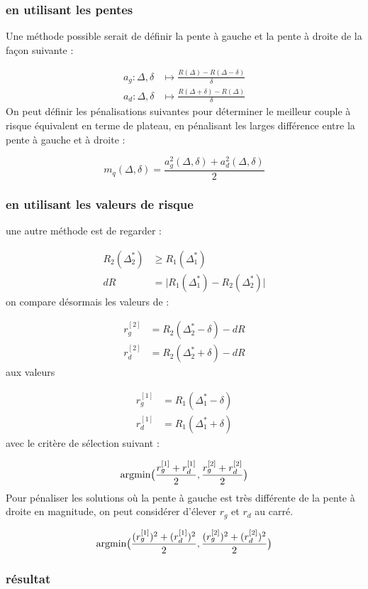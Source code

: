 \subsubsection{en utilisant les pentes}


Une méthode possible serait de définir la pente à gauche et la pente à droite de la façon suivante :

\begin{align*}
	a_g : \Delta, \delta & \mapsto \frac{R(\Delta) - R(\Delta - \delta)}{\delta} \\
	a_d : \Delta, \delta & \mapsto \frac{R(\Delta + \delta) - R(\Delta)}{\delta}
\end{align*}
On peut définir les pénalisations suivantes pour déterminer le meilleur couple à risque équivalent en terme de plateau, en pénalisant les larges différence entre la pente à gauche et à droite :

\begin{equation*}
	m_q(\Delta, \delta) = \frac{a_g^2(\Delta, \delta) + a_d^2(\Delta, \delta)}{2}
\end{equation*}

\subsubsection{en utilisant les valeurs de risque}
une autre méthode est de regarder :

\begin{align*}
	R_2(\Delta^*_2) & \geq R_1(\Delta^*_1)                                      \\
	dR              & = \bigl\vert R_1(\Delta^*_1) - R_2(\Delta^*_2) \bigr\vert
\end{align*}
on compare désormais les valeurs de :

\begin{align*}
	r_g^{[2]} & = R_2(\Delta^*_2 - \delta) - dR \\
	r_d^{[2]} & = R_2(\Delta^*_2 + \delta) - dR
\end{align*}
aux valeurs

\begin{align*}
	r_g^{[1]} & = R_1(\Delta^*_1 - \delta) \\
	r_d^{[1]} & = R_1(\Delta^*_1 + \delta)
\end{align*}
avec le critère de sélection suivant :

\begin{equation*}
	\argmin \bigl( \frac{r_g^{[1]} + r_d^{[1]}}{2}, \frac{r_g^{[2]} + r_d^{[2]}}{2}  \bigr)
\end{equation*}
Pour pénaliser les solutions où la pente à gauche est très différente de la pente à droite en magnitude, on peut considérer d'élever $r_g$ et $r_d$ au carré.

\begin{equation*}
	\argmin \bigl( \frac{(r_g^{[1]})^2 + (r_d^{[1]})^2}{2}, \frac{(r_g^{[2]})^2 + (r_d^{[2]})^2}{2}  \bigr)
\end{equation*}
\subsubsection{résultat}
